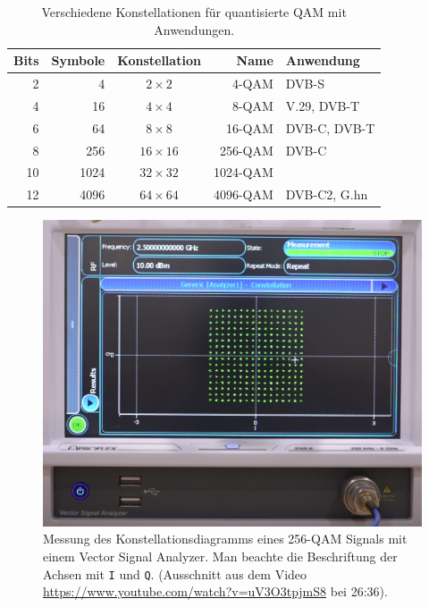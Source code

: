 \begin{table}
\centering
\begin{tabular}{rrcrl}
\hline
Bits&Symbole&Konstellation&Name&Anwendung\\
\hline
   2&      4& $2\times 2$ &   4-QAM&DVB-S       \\
   4&     16& $4\times 4$ &   8-QAM&V.29, DVB-T \\
   6&     64& $8\times 8$ &  16-QAM&DVB-C, DVB-T\\
   8&    256&$16\times 16$& 256-QAM&DVB-C       \\
  10&   1024&$32\times 32$&1024-QAM&            \\
  12&   4096&$64\times 64$&4096-QAM&DVB-C2, G.hn\\
\hline
\end{tabular}
\caption{Verschiedene Konstellationen für quantisierte QAM mit Anwendungen.
\label{table:qam:xqam}}
\end{table}

\begin{figure}
\centering
\includegraphics[width=1.0\hsize]{applications/qam/analyzer.png}
\caption{Messung des Konstellationsdiagramms eines 256-QAM Signals
mit einem Vector Signal Analyzer.
Man beachte die Beschriftung der Achsen mit \texttt{I} und \texttt{Q}.
(Ausschnitt aus dem Video \url{https://www.youtube.com/watch?v=uV3O3tpjmS8}
bei 26:36).
\label{figure:qam:analyzer}}
\end{figure}

